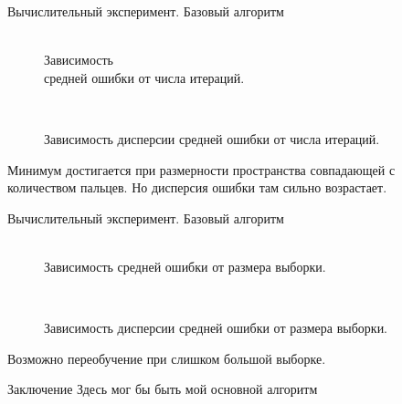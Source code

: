 \documentclass{beamer}
\begin{document}
\begin{frame}{Вычислительный эксперимент. Базовый алгоритм}
\begin{figure}[h]
    \begin{minipage}[h]{0.4\linewidth}
     \\
    \caption{Зависимость \\ средней ошибки от числа итераций.}
    \end{minipage}
    \hfill
    \begin{minipage}[h]{0.4\linewidth}
     \\
    \caption{Зависимость дисперсии средней ошибки от числа итераций.}
    \end{minipage}
\label{fg:Example}
\end{figure}
\begin{block}{}
Минимум достигается при размерности пространства совпадающей с количеством пальцев. Но дисперсия ошибки там сильно возрастает.
\end{block}
\end{frame}
\begin{frame}{Вычислительный эксперимент. Базовый алгоритм}
\begin{figure}[h]
    \begin{minipage}[h]{0.4\linewidth}
     \\
    \caption{Зависимость средней ошибки от размера выборки.}
    \end{minipage}
    \hfill
    \begin{minipage}[h]{0.4\linewidth}
     \\
    \caption{Зависимость дисперсии средней ошибки от размера выборки.}
    \end{minipage}
\label{fg:Example}
\end{figure}
\begin{block}{}
Возможно переобучение при слишком большой выборке.
\end{block}
\end{frame}
\begin{frame}{Заключение}
Здесь мог бы быть мой основной алгоритм
\end{frame}
\end{document}
